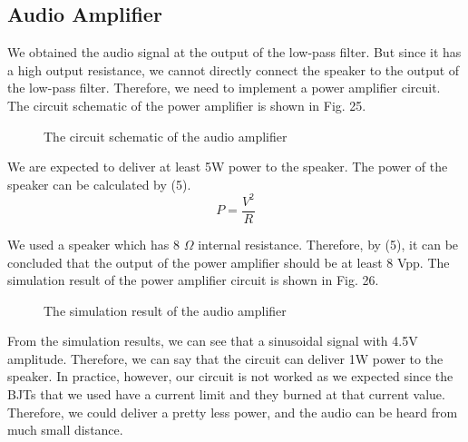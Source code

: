\documentclass[conference]{IEEEtran}
\begin{document}
\subsection{Audio Amplifier}
\par We obtained the audio signal at the output of the low-pass filter. But since it has a high output resistance, we cannot directly connect 
the speaker to the output of the low-pass filter. Therefore, we need to implement a power amplifier circuit. The circuit schematic of the power 
amplifier is shown in Fig. 25. 
\begin{figure}[H]
   \centerline{}
    \caption{The circuit schematic of the audio amplifier}
\end{figure}
\par We are expected to deliver at least 5W power to the speaker. The power of the speaker can be calculated by (5).
\begin{equation}
    P = \frac{V^2}{R}
\end{equation}
\par We used a speaker which has 8 \(\Omega\) internal resistance. Therefore, by (5), it can be concluded that the output of the power amplifier should be at least 8 Vpp. The simulation result of the power amplifier circuit is shown in Fig. 26. 
\begin{figure}[H]
   \centerline{}
    \caption{The simulation result of the audio amplifier}
\end{figure}
\par From the simulation results, we can see that a sinusoidal signal with 4.5V amplitude. Therefore, we can say that the circuit can deliver 
1W power to the speaker. In practice, however, our circuit is not worked as we expected since the BJTs that we used have a current limit and they burned 
at that current value. Therefore, we could deliver a pretty less power, and the audio can be heard from much small distance. 
\end{document}
